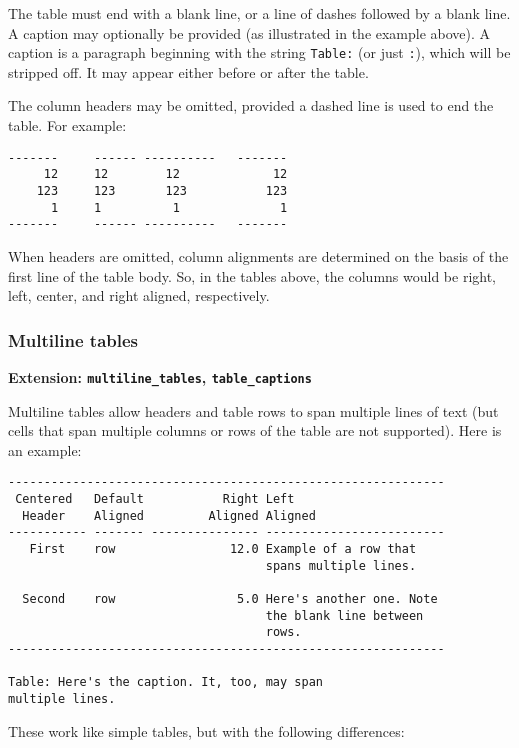 \documentclass[]{article}
\begin{document}
The table must end with a blank line, or a line of dashes followed by a
blank line. A caption may optionally be provided (as illustrated in the
example above). A caption is a paragraph beginning with the string
\texttt{Table:} (or just \texttt{:}), which will be stripped off. It may
appear either before or after the table.

The column headers may be omitted, provided a dashed line is used to end
the table. For example:

\begin{verbatim}
-------     ------ ----------   -------
     12     12        12             12
    123     123       123           123
      1     1          1              1
-------     ------ ----------   -------
\end{verbatim}

When headers are omitted, column alignments are determined on the basis
of the first line of the table body. So, in the tables above, the
columns would be right, left, center, and right aligned, respectively.

\subsubsection{Multiline tables}

\textbf{Extension: \texttt{multiline\_tables}, \texttt{table\_captions}}

Multiline tables allow headers and table rows to span multiple lines of
text (but cells that span multiple columns or rows of the table are not
supported). Here is an example:

\begin{verbatim}
-------------------------------------------------------------
 Centered   Default           Right Left
  Header    Aligned         Aligned Aligned
----------- ------- --------------- -------------------------
   First    row                12.0 Example of a row that
                                    spans multiple lines.

  Second    row                 5.0 Here's another one. Note
                                    the blank line between
                                    rows.
-------------------------------------------------------------

Table: Here's the caption. It, too, may span
multiple lines.
\end{verbatim}

These work like simple tables, but with the following differences:
\end{document}
